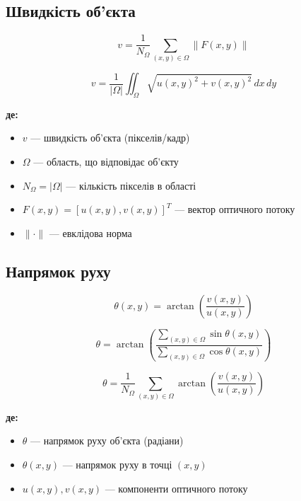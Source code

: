 \documentclass[14pt, a4paper]{extarticle}
\numberwithin{equation}{section}
\begin{document}
\subsection{Швидкість об'єкта}

\begin{equation}
\boxed{v = \frac{1}{N_\Omega} \sum_{(x,y) \in \Omega} \|F(x,y)\|} \tag{41}
\end{equation}

\begin{equation}
\boxed{v = \frac{1}{|\Omega|} \iint_{\Omega} \sqrt{u(x,y)^2 + v(x,y)^2} \, dx\,dy} \tag{42}
\end{equation}

\textbf{де:}
\begin{itemize}
\item $v$ — швидкість об'єкта (пікселів/кадр)
\item $\Omega$ — область, що відповідає об'єкту
\item $N_\Omega = |\Omega|$ — кількість пікселів в області
\item $F(x,y) = [u(x,y), v(x,y)]^T$ — вектор оптичного потоку
\item $\|\cdot\|$ — евклідова норма
\end{itemize}

\subsection{Напрямок руху}

\begin{equation}
\theta(x,y) = \arctan\left( \frac{v(x,y)}{u(x,y)} \right) \tag{43}
\end{equation}

\begin{equation}
\boxed{\theta = \arctan\left( \frac{\sum_{(x,y) \in \Omega} \sin\theta(x,y)}{\sum_{(x,y) \in \Omega} \cos\theta(x,y)} \right)} \tag{44}
\end{equation}

\begin{equation}
\boxed{\theta = \frac{1}{N_\Omega} \sum_{(x,y) \in \Omega} \arctan\left( \frac{v(x,y)}{u(x,y)} \right)} \tag{45}
\end{equation}

\textbf{де:}
\begin{itemize}
\item $\theta$ — напрямок руху об'єкта (радіани)
\item $\theta(x,y)$ — напрямок руху в точці $(x,y)$
\item $u(x,y), v(x,y)$ — компоненти оптичного потоку
\end{itemize}
\end{document}
